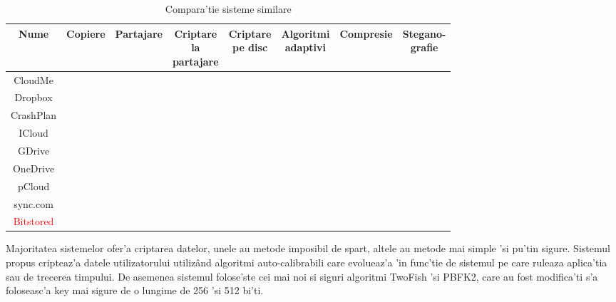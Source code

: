 \documentclass[12pt,a4paper,twoside]{report}
\newcommand{\greencheck}{\color{green}  \ding{51}}
\newcommand{\redxmark}{\color{red} \ding{55}}
\begin{document}
\begin{table}[H]
\small
\centering
\caption{Compara'tie sisteme similare}
\begin{tabular}{|c|c|c|c|c|c|c|c|}          
\hline               
Nume & Copiere & Partajare & \makecell{Criptare\\ la \\partajare }& \makecell{Criptare\\ pe disc} & \makecell{Algoritmi \\adaptivi} & Compresie & \makecell{Stegano-\\grafie} \\ [0.5ex]   
\hline 
CloudMe & \greencheck & \greencheck & \greencheck & \redxmark & \redxmark & \redxmark & \redxmark \\    
\hline           
Dropbox & \greencheck & \greencheck & \redxmark & \greencheck & \redxmark & \greencheck & \redxmark \\               
\hline
CrashPlan & \greencheck & \redxmark & \redxmark & \greencheck & \redxmark & \redxmark & \redxmark \\   
\hline
ICloud & \greencheck & \greencheck & \redxmark & \greencheck & \redxmark & \redxmark & \redxmark \\   
\hline
GDrive & \greencheck & \greencheck & \redxmark & \greencheck & \redxmark & \greencheck & \redxmark \\   
\hline
OneDrive & \greencheck & \greencheck & \redxmark & \redxmark & \redxmark & \redxmark & \redxmark \\   
\hline
pCloud & \greencheck & \greencheck & \greencheck & \greencheck & \redxmark & \redxmark & \redxmark \\   
\hline
sync.com & \greencheck & \greencheck & \greencheck & \greencheck & \redxmark & \redxmark & \redxmark \\   
\hline
\textcolor{red} {Bitstored} & \greencheck & \greencheck & \greencheck & \greencheck & \greencheck & \greencheck & \greencheck \\               
\hline                              
\end{tabular}
\label{table:comparationtable}             
\end{table}
Majoritatea sistemelor ofer'a criptarea datelor, unele au metode imposibil de spart, altele au metode mai simple 'si pu'tin sigure. Sistemul propus cripteaz'a datele utilizatorului utilizând algoritmi auto-calibrabili  care evolueaz'a 'in func'tie de sistemul pe care ruleaza aplica'tia sau de trecerea timpului. De asemenea sistemul folose'ste cei mai noi si siguri algoritmi TwoFish 'si PBFK2, care au fost modifica'ti s'a foloseasc'a key mai sigure de o lungime de 256 'si 512 bi'ti.
\end{document}
